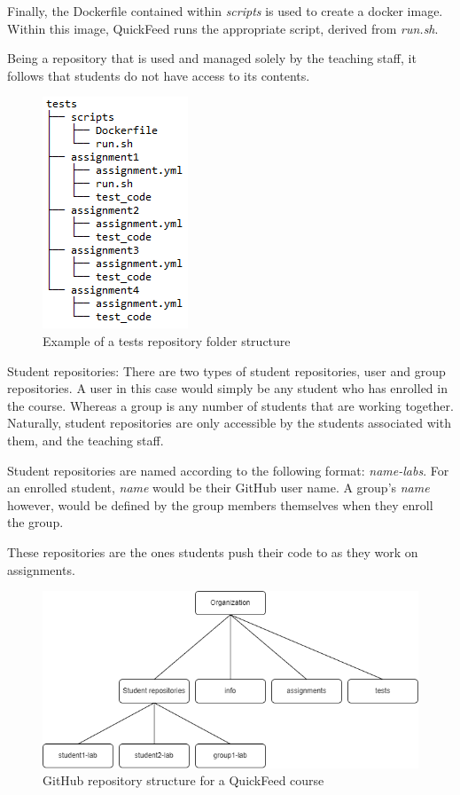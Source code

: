 Finally, the Dockerfile contained within \textit{scripts} is used to create a docker image.
Within this image, QuickFeed runs the appropriate script, derived from \textit{run.sh}.

Being a repository that is used and managed solely by the teaching staff, it follows that students do not have access to its contents.

\begin{figure}[ht]
    \centering
    \includegraphics[scale=0.8]{photos/tests-repository-structure.PNG}
    \caption{Example of a tests repository folder structure}
    \label{fig:tests-repository-structure}
\end{figure}

Student repositories: There are two types of student repositories, user and group repositories.
A user in this case would simply be any student who has enrolled in the course.
Whereas a group is any number of students that are working together.
Naturally, student repositories are only accessible by the students associated with them, and the teaching staff.

Student repositories are named according to the following format: \textit{name-labs}.
For an enrolled student, \textit{name} would be their GitHub user name.
A group's \textit{name} however, would be defined by the group members themselves when they enroll the group.

These repositories are the ones students push their code to as they work on assignments.

\begin{figure}[ht]
    \centering
    \includegraphics[width=\textwidth]{photos/qf-repository-structure.png}
    \caption{GitHub repository structure for a QuickFeed course}
    \label{fig:qf-repository-structure}
\end{figure}

